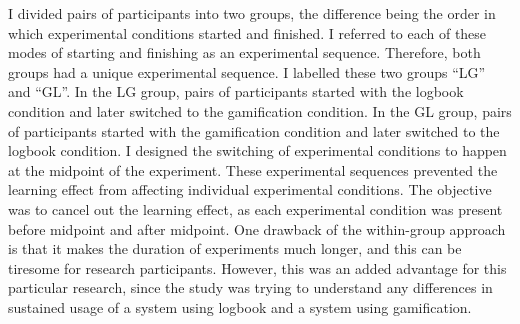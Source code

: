 I divided pairs of participants into two groups, the difference being the order in which experimental conditions started and finished.  I referred to each of these modes of starting and finishing as an experimental sequence. Therefore, both groups had a unique experimental sequence. I labelled these two groups ``LG'' and ``GL''.  In the LG group, pairs of participants started with the logbook condition and later switched to the gamification condition. In the GL group, pairs of participants started with the gamification condition and later switched to the logbook condition. I designed the switching of experimental conditions to happen at the midpoint of the experiment. These experimental sequences prevented the learning effect from affecting individual experimental conditions. The objective was to cancel out the learning effect, as each experimental condition was present before midpoint and after midpoint. One drawback of the within-group approach is that it makes the duration of experiments much longer, and this can be tiresome for research participants. However, this was an added advantage for this particular research, since the study was trying to understand any differences in sustained usage of a system using logbook and a system using gamification.

